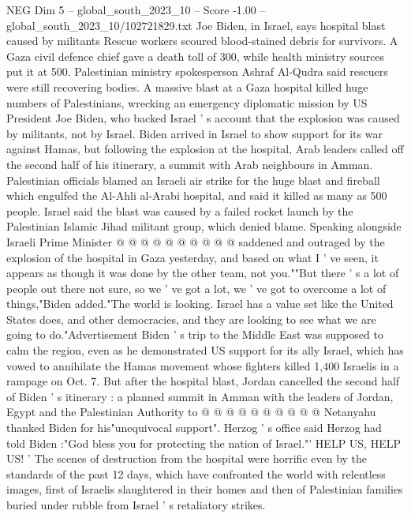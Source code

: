 \begin{textsample}{NEG Dim 5 – global\_south\_2023\_10 – Score -1.00 – global\_south\_2023\_10/102721829.txt}  \label{ex:f5_neg_064}
Joe Biden, in Israel, says hospital blast caused by militants Rescue workers scoured blood-stained debris for survivors.
A Gaza civil defence chief gave a death toll of 300, while health ministry sources put it at 500.
Palestinian ministry spokesperson Ashraf Al-Qudra said rescuers were still recovering bodies.
A massive blast at a Gaza hospital killed huge numbers of Palestinians, wrecking an emergency diplomatic mission by US President Joe Biden, who backed Israel ' s account that the explosion was caused by militants, not by Israel.
Biden arrived in Israel to show support for its war against Hamas, but following the explosion at the hospital, Arab leaders called off the second half of his itinerary, a summit with Arab neighbours in Amman.
Palestinian officials blamed an Israeli air strike for the huge blast and fireball which engulfed the Al-Ahli al-Arabi hospital, and said it killed as many as 500 people.
Israel said the blast was caused by a failed rocket launch by the Palestinian Islamic Jihad militant group, which denied blame.
Speaking alongside Israeli Prime Minister @ @ @ @ @ @ @ @ @ @ saddened and outraged by the explosion of the hospital in Gaza yesterday, and based on what I ' ve seen, it appears as though it was done by the other team, not you.""But there ' s a lot of people out there not sure, so we ' ve got a lot, we ' ve got to overcome a lot of things,"Biden added."The world is looking.
Israel has a value set like the United States does, and other democracies, and they are looking to see what we are going to do."Advertisement Biden ' s trip to the Middle East was supposed to calm the region, even as he demonstrated US support for its ally Israel, which has vowed to annihilate the Hamas movement whose fighters killed 1,400 Israelis in a rampage on Oct. 7.
But after the hospital blast, Jordan cancelled the second half of Biden ' s itinerary : a planned summit in Amman with the leaders of Jordan, Egypt and the Palestinian Authority to @ @ @ @ @ @ @ @ @ @ Netanyahu thanked Biden for his"unequivocal support".
Herzog ' s office said Herzog had told Biden :"God bless you for protecting the nation of Israel."' HELP US, HELP US! ' The scenes of destruction from the hospital were horrific even by the standards of the past 12 days, which have confronted the world with relentless images, first of Israelis slaughtered in their homes and then of Palestinian families buried under rubble from Israel ' s retaliatory strikes.

\end{textsample}
